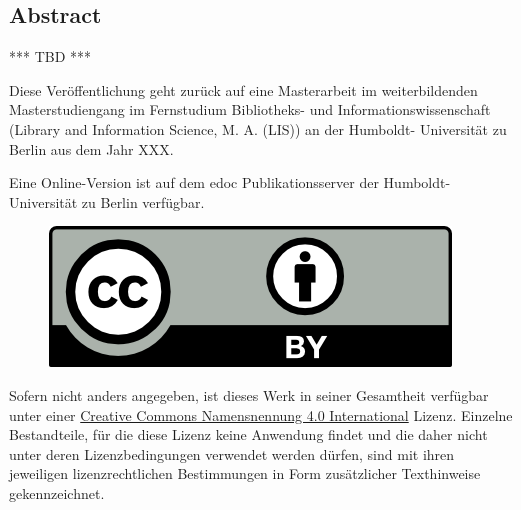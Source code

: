 \vspace*{\fill}
\subsection*{\textrm{\foreignlanguage{english}{Abstract}}}
*** TBD ***

\vspace*{\fill}
Diese Veröffentlichung geht zurück auf eine Masterarbeit im weiterbildenden Ma\-ster\-stu\-di\-en\-gang im Fernstudium Bibliotheks- und Informationswissenschaft (\foreignlanguage{english}{Library and Information Science}, M. A. (LIS)) an der Humboldt- Universität zu Berlin aus dem Jahr XXX.\par
%
%
%
%
Eine Online-Version ist auf dem edoc Publikationsserver der Humboldt-Universität zu Berlin verfügbar. \par

\begin{figure}
\vspace{-.481cm}
\includegraphics[scale=.7]{BHR_template/by.png}
\end{figure}

\small  Sofern nicht anders angegeben, ist dieses Werk in seiner Gesamtheit verfügbar unter einer \href{https://creativecommons.org/licenses/by/4.0/}{\foreignlanguage{english}{Creative Commons} Namensnennung 4.0 International} Lizenz. %
Einzelne Bestandteile, für die diese Lizenz keine Anwendung findet und die daher nicht unter deren Lizenzbedingungen verwendet werden dürfen, sind mit ihren jeweiligen lizenzrechtlichen Bestimmungen in Form zusätzlicher Texthinweise gekennzeichnet. 
